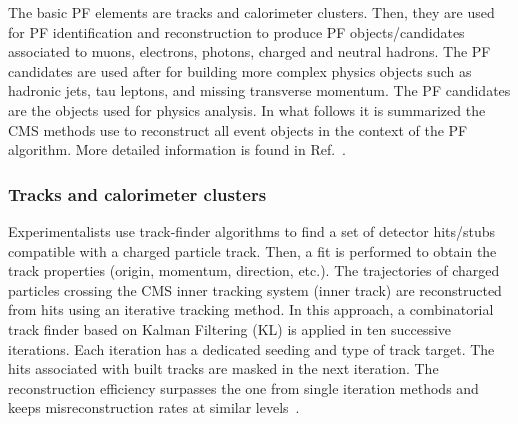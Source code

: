 The basic PF elements are tracks and calorimeter clusters. Then, they are used for PF identification and reconstruction to produce PF objects/candidates associated to muons, electrons, photons, charged and neutral hadrons. The PF candidates are used after for building more complex physics objects such as hadronic jets, tau leptons, and missing transverse momentum. The PF candidates are the objects used for physics analysis. In what follows it is summarized the CMS methods use to reconstruct all event objects in the context of the PF algorithm. More detailed information is found in Ref.~\cite{cmspfalgo}.

\subsubsection{Tracks and calorimeter clusters}
Experimentalists use track-finder algorithms to find a set of detector hits/stubs compatible with a charged particle track. Then, a fit is performed to obtain the track properties (origin, momentum, direction, etc.). The trajectories of charged particles crossing the CMS inner tracking system (inner track) are reconstructed from hits using an iterative tracking method. In this approach, a combinatorial track finder based on Kalman Filtering (KL) is applied in ten successive iterations. Each iteration has a dedicated seeding and type of track target. The hits associated with built tracks are masked in the next iteration. The reconstruction efficiency surpasses the one from single iteration methods and keeps misreconstruction rates at similar levels~\cite{cmspfalgo}.

